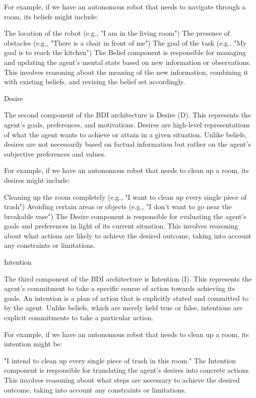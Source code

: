 For example, if we have an autonomous robot that needs to navigate through a
room, its beliefs might include:

The location of the robot (e.g., "I am in the living room") The presence of obstacles
(e.g., "There is a chair in front of me") The goal of the task (e.g., "My goal is
to reach the kitchen") The Belief component is responsible for managing and updating
the agent's mental state based on new information or observations. This involves
reasoning about the meaning of the new information, combining it with existing beliefs,
and revising the belief set accordingly.

Desire

The second component of the BDI architecture is Desire (D). This represents the
agent's goals, preferences, and motivations. Desires are high-level representations
of what the agent wants to achieve or attain in a given situation. Unlike
beliefs, desires are not necessarily based on factual information but rather on the
agent's subjective preferences and values.

For example, if we have an autonomous robot that needs to clean up a room, its desires
might include:

Cleaning up the room completely (e.g., "I want to clean up every single piece of
trash") Avoiding certain areas or objects (e.g., "I don't want to go near the breakable
vase") The Desire component is responsible for evaluating the agent's goals and preferences
in light of its current situation. This involves reasoning about what actions
are likely to achieve the desired outcome, taking into account any constraints or
limitations.

Intention

The third component of the BDI architecture is Intention (I). This represents the
agent's commitment to take a specific course of action towards achieving its goals.
An intention is a plan of action that is explicitly stated and committed to by
the agent. Unlike beliefs, which are merely held true or false, intentions are explicit
commitments to take a particular action.

For example, if we have an autonomous robot that needs to clean up a room, its intention
might be:

"I intend to clean up every single piece of trash in this room." The Intention
component is responsible for translating the agent's desires into concrete
actions. This involves reasoning about what steps are necessary to achieve the desired
outcome, taking into account any constraints or limitations.

